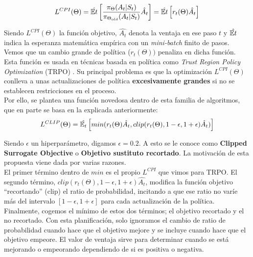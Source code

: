 \documentclass[11pt,fleqn]{book} %
\begin{document}
\begin{equation}
L^{CPI}(\Theta)=\hat{\mathbb{E} t}\left[\frac{\pi_\Theta(A_t|S_t)}{\pi_{\Theta_{old}}(A_t|S_t)}\hat{A_t}\right]=\hat{\mathbb{E} t}\left[r_t(\Theta)\hat{A_t}\right] 
\end{equation}

Siendo $L^{CPI}(\Theta)$ la función objetivo, $\hat{A_t}$ denota la ventaja en ese paso $t$ y $\hat{\mathbb{E} t}$ indica la esperanza matemática empírica con un \textit{mini-batch} finito de pasos. Vemos que un cambio grande de política ($r_t(\Theta))$ penaliza en dicha función.\\

Esta función es usada en técnicas basada en política como \textit{Trust Region Policy Optimization} (TRPO) \cite{article:TRPO}. Su principal problema es que la optimización $L^{CPI}(\Theta)$ conlleva a unas actualizaciones de política \textbf{excesivamente grandes} si no se establecen restricciones en el proceso. \\

Por ello, se plantea una función novedosa dentro de esta familia de algoritmos, que en parte se basa en la explicada anteriormente: \\

\begin{equation}
L^{CLIP}(\Theta)=\hat{\mathbb{E}_ t}\left[min(r_t(\Theta)\hat{A_t},clip(r_t(\Theta),1-\epsilon,1+\epsilon)\hat{A_t})\right]
\end{equation}

Siendo $\epsilon$ un hiperparámetro, digamos $\epsilon=0.2$. A esto se le conoce como \textbf{Clipped Surrogate Objective} o \textbf{Objetivo sustituto recortado}. La motivación de esta propuesta viene dada por varias razones.\\

El primer término dentro de $min$ es el propio $L^{CPI}$ que vimos para TRPO. El segundo término, $clip(r_t(\Theta),1-\epsilon,1+\epsilon)\hat{A_t}$, modifica la función objetivo ``recortando'' (clip) el ratio de probabilidad, incitando a que ese ratio no varíe más del intervalo $[1-\epsilon,1+\epsilon]$ para cada actualización de la política. \\

Finalmente, cogemos el mínimo de estos dos términos; el objetivo recortado y el no recortado. Con esta planificación, solo ignoramos el cambio de ratio de probabilidad cuando hace que el objetivo mejore y se incluye cuando hace que el objetivo empeore. El valor de ventaja sirve para determinar cuando se está mejorando o empeorando dependiendo de si es positiva o negativa. \\
\end{document}

